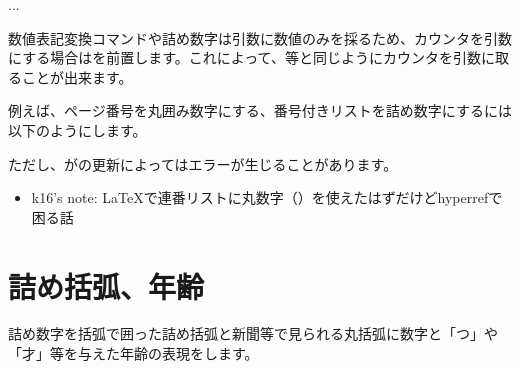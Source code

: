 \documentclass[uplatex, dvipdfmx, paper=a4paper, line_length=45zw, head_space=7zw, foot_space=10zw]{jlreq}
\begin{document}
\begin{texsource}
\begin{enumerate}[label=\protect\ajMaru{\arabic{*}}] ... \end{enumerate}
\end{texsource}

数値表記変換コマンドや詰め数字は引数に数値のみを採るため、カウンタを引数にする場合はを前置します。これによって、等と同じようにカウンタを引数に取ることが出来ます。

例えば、ページ番号を丸囲み数字にする、番号付きリストを詰め数字にするには以下のようにします。

\begin{texsource}
\renewcommand{\thepage}{\ajLabel\ajMaru{page}}
\renewcommand{\theenumi}{\ajLabel\ajTumesuji*{enumi}}
\end{texsource}

ただし、がの更新によってはエラーが生じることがあります。

\begin{itemize}
  \item k16's note: \LaTeX で連番リストに丸数字（）を使えたはずだけどhyperrefで困る話
\end{itemize}

\section{詰め括弧、年齢}

詰め数字を括弧で囲った詰め括弧と新聞等で見られる丸括弧に数字と「つ」や「才」等を与えた年齢の表現をします。
\end{document}
